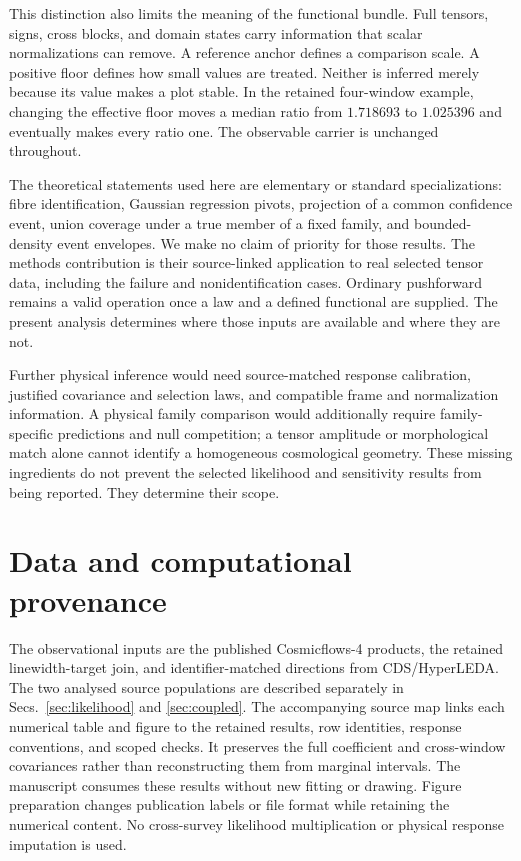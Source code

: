This distinction also limits the meaning of the functional bundle. Full tensors, signs, cross blocks, and domain states carry information that scalar normalizations can remove. A reference anchor defines a comparison scale. A positive floor defines how small values are treated. Neither is inferred merely because its value makes a plot stable. In the retained four-window example, changing the effective floor moves a median ratio from $1.718693$ to $1.025396$ and eventually makes every ratio one. The observable carrier is unchanged throughout.

The theoretical statements used here are elementary or standard specializations: fibre identification, Gaussian regression pivots, projection of a common confidence event, union coverage under a true member of a fixed family, and bounded-density event envelopes. We make no claim of priority for those results. The methods contribution is their source-linked application to real selected tensor data, including the failure and nonidentification cases. Ordinary pushforward remains a valid operation once a law and a defined functional are supplied. The present analysis determines where those inputs are available and where they are not.

Further physical inference would need source-matched response calibration, justified covariance and selection laws, and compatible frame and normalization information. A physical family comparison would additionally require family-specific predictions and null competition; a tensor amplitude or morphological match alone cannot identify a homogeneous cosmological geometry. These missing ingredients do not prevent the selected likelihood and sensitivity results from being reported. They determine their scope.

\section*{Data and computational provenance}

The observational inputs are the published Cosmicflows-4 products, the retained linewidth-target join, and identifier-matched directions from CDS/HyperLEDA. The two analysed source populations are described separately in Secs.~\ref{sec:likelihood} and \ref{sec:coupled}. The accompanying source map links each numerical table and figure to the retained results, row identities, response conventions, and scoped checks. It preserves the full coefficient and cross-window covariances rather than reconstructing them from marginal intervals. The manuscript consumes these results without new fitting or drawing. Figure preparation changes publication labels or file format while retaining the numerical content. No cross-survey likelihood multiplication or physical response imputation is used.
